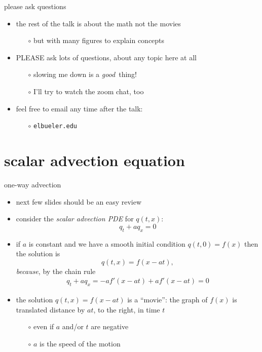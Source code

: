 \documentclass[10pt,dvipsnames,usepdftitle=false,
hyperref={pdftitle = {Finite volume methods},
    pdfauthor = {Ed Bueler}}]{beamer}
\begin{document}
\begin{frame}{please ask questions}

\begin{itemize}
\item the rest of the talk is about the math not the movies
    \begin{itemize}
    \item[$\circ$] but with many figures to explain concepts
    \end{itemize}
\item \alert{PLEASE} ask lots of questions, about any topic here at all
    \begin{itemize}
    \item[$\circ$] slowing me down is a \emph{good}\, thing!
    \item[$\circ$] I'll try to watch the zoom chat, too
    \end{itemize}
\item feel free to email any time after the talk:
    \begin{itemize}
    \item[$\circ$] \texttt{elbueler\@@alaska.edu}
    \end{itemize}
\end{itemize}
\end{frame}



\section{scalar advection equation}

\begin{frame}{one-way advection}

\begin{itemize}
\item next few slides should be an easy review
\item consider the \emph{scalar advection PDE} for $q(t,x)$:
    $$q_t + a q_x=0$$

\item if $a$ is constant and we have a smooth initial condition $q(t,0)=f(x)$ then the solution is
    $$q(t,x) = f(x-at),$$
\emph{because}, by the chain rule
\begin{gather*}
q_t + a q_x = -a f'(x-at) + a f'(x-at) = 0
\end{gather*}
\item the solution $q(t,x)=f(x-at)$ is a ``movie'': the graph of $f(x)$ is translated distance by $at$, to the right, in time $t$
    \begin{itemize}
    \item[$\circ$] even if $a$ and/or $t$ are negative
    \item[$\circ$] $a$ is the speed of the motion
    \end{itemize}
\end{itemize}
\end{frame}
\end{document}
